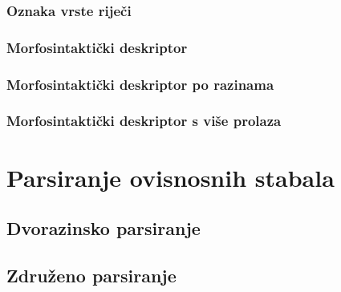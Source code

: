 \documentclass[times, utf8, diplomski]{fer}
\begin{document}
\subsubsection{Oznaka vrste riječi}

\subsubsection{Morfosintaktički deskriptor}

\subsubsection{Morfosintaktički deskriptor po razinama}

\subsubsection{Morfosintaktički deskriptor s više prolaza}

\section{Parsiranje ovisnosnih stabala}

\subsection{Dvorazinsko parsiranje}

\subsection{Združeno parsiranje}









\nocite{daume06thesis}
\nocite{daume09searn}
\nocite{daume06searn-practice}
\nocite{daume15reductions}
\nocite{daume15lols}
\nocite{daume15rewrite}
\nocite{daume14lts}
\end{document}
